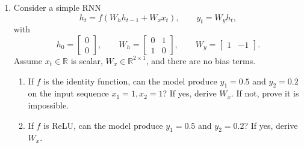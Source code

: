 \begin{enumerate}[label=(\alph*)]
\item Consider a simple RNN
\[
h_t = f(W_h h_{t-1} + W_x x_t),
\qquad
y_t = W_y h_t,
\]
with
\[
h_0 = \begin{bmatrix} 0 \\ 0 \end{bmatrix},
\qquad
W_h =
\begin{bmatrix}
0 & 1 \\
1 & 0
\end{bmatrix},
\qquad
W_y = \begin{bmatrix} 1 & -1 \end{bmatrix}.
\]
Assume \(x_t \in \mathbb{R}\) is scalar, \(W_x \in \mathbb{R}^{2 \times 1}\), and there are no bias terms.

\begin{enumerate}[label=(\roman*)]
\item If \(f\) is the identity function, can the model produce \(y_1=0.5\) and \(y_2=0.2\) on the input sequence \(x_1=1, x_2=1\)? If yes, derive \(W_x\). If not, prove it is impossible.
\item If \(f\) is ReLU, can the model produce \(y_1=0.5\) and \(y_2=0.2\)? If yes, derive \(W_x\).
\end{enumerate}
\end{enumerate}
